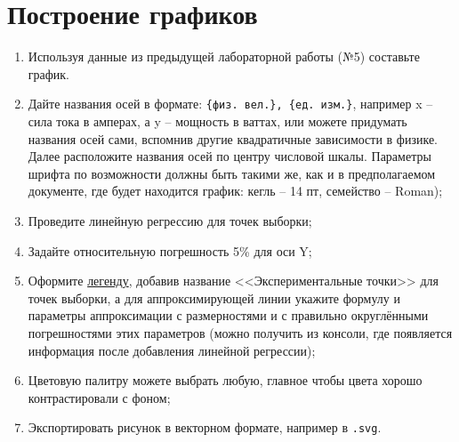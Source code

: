 \documentclass[14pt,a4paper]{article}
\begin{document}
\section{Построение графиков}
\begin{enumerate}
    \item Используя данные из предыдущей лабораторной работы (№5) составьте график. 
    \item Дайте названия осей в формате: \verb|{физ. вел.}, {ед. изм.}|, например x -- сила тока в амперах, а y -- мощность в ваттах, или можете придумать названия осей сами, вспомнив другие квадратичные зависимости в физике. Далее расположите названия осей по центру числовой шкалы. Параметры шрифта по возможности должны быть такими же, как и в предполагаемом документе, где будет находится график: кегль -- 14 пт, семейство -- Roman);
    \item Проведите линейную регрессию для точек выборки;
    \item Задайте относительную погрешность 5\% для оси Y;
    \item Оформите \href{https://www.stimulsoft.com/ru/documentation/online/user-manual/index.html?report_internals_charts_chart_tab_legend.htm}{легенду}, добавив название <<Экспериментальные точки>> для точек выборки, а для аппроксимирующей линии укажите формулу и параметры аппроксимации с размерностями и с правильно округлёнными погрешностями этих параметров (можно получить из консоли, где появляется информация после добавления линейной регрессии);
    \item Цветовую палитру можете выбрать любую, главное чтобы цвета хорошо контрастировали с фоном;
    \item Экспортировать рисунок в векторном формате, например в \verb|.svg|.
\end{enumerate}

% 
\end{document}
